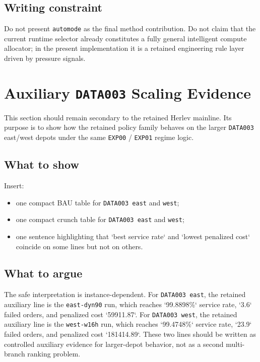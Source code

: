\subsection{Writing constraint}
\label{sec:results-runtime-constraint}

Do not present \texttt{automode} as the final method contribution.
Do not claim that the current runtime selector already constitutes a fully general intelligent compute allocator; in the present implementation it is a retained engineering rule layer driven by pressure signals.

\section{Auxiliary \texttt{DATA003} Scaling Evidence}
\label{sec:results-data003}

This section should remain secondary to the retained Herlev mainline.
Its purpose is to show how the retained policy family behaves on the larger \texttt{DATA003} east/west depots under the same \texttt{EXP00} / \texttt{EXP01} regime logic.

\subsection{What to show}
\label{sec:results-data003-show}

Insert:
\begin{itemize}
    \item one compact BAU table for \texttt{DATA003 east} and \texttt{west};
    \item one compact crunch table for \texttt{DATA003 east} and \texttt{west};
    \item one sentence highlighting that `best service rate` and `lowest penalized cost` coincide on some lines but not on others.
\end{itemize}

\subsection{What to argue}
\label{sec:results-data003-argue}

The safe interpretation is instance-dependent.
For \texttt{DATA003 east}, the retained auxiliary line is the \texttt{east-dyn90} run, which reaches `99.8898\%` service rate, `3.6` failed orders, and penalized cost `59911.87`.
For \texttt{DATA003 west}, the retained auxiliary line is the \texttt{west-w16h} run, which reaches `99.4748\%` service rate, `23.9` failed orders, and penalized cost `181414.89`.
These two lines should be written as controlled auxiliary evidence for larger-depot behavior, not as a second multi-branch ranking problem.


